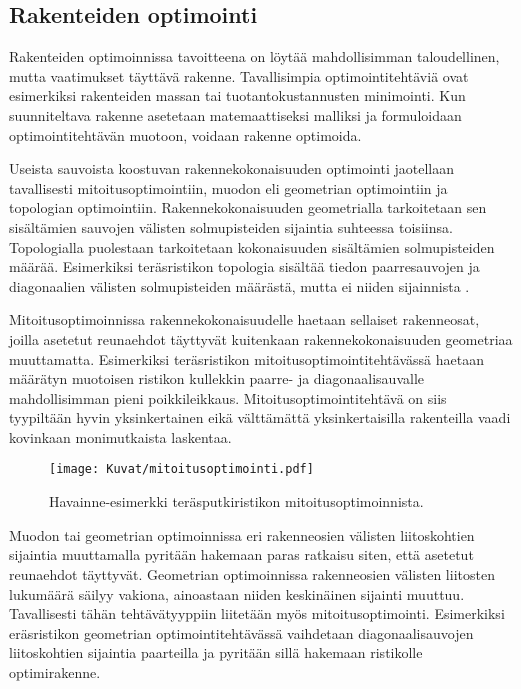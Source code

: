 \documentclass[12pt]{article}
\newenvironment{content}{\pagenumbering{arabic}}{}
\begin{document}
\begin{content}
\subsection{Rakenteiden optimointi}

Rakenteiden optimoinnissa tavoitteena on löytää mahdollisimman taloudellinen, mutta vaatimukset täyttävä rakenne. Tavallisimpia optimointitehtäviä ovat esimerkiksi rakenteiden massan tai tuotantokustannusten minimointi. Kun suunniteltava rakenne asetetaan matemaattiseksi malliksi ja formuloidaan optimointitehtävän muotoon, voidaan rakenne optimoida.  

Useista sauvoista koostuvan rakennekokonaisuuden optimointi jaotellaan tavallisesti mitoitusoptimointiin, muodon eli geometrian optimointiin ja topologian optimointiin. Rakennekokonaisuuden geometrialla tarkoitetaan sen sisältämien sauvojen välisten solmupisteiden sijaintia suhteessa toisiinsa. Topologialla puolestaan tarkoitetaan kokonaisuuden sisältämien solmupisteiden määrää. Esimerkiksi teräsristikon topologia sisältää tiedon paarresauvojen ja diagonaalien välisten solmupisteiden määrästä, mutta ei niiden sijainnista \parencite[2]{mela_doct}.

Mitoitusoptimoinnissa rakennekokonaisuudelle haetaan sellaiset rakenneosat, joilla asetetut reunaehdot täyttyvät kuitenkaan rakennekokonaisuuden geometriaa muuttamatta. Esimerkiksi teräsristikon mitoitusoptimointitehtävässä haetaan määrätyn muotoisen ristikon kullekkin paarre- ja diagonaalisauvalle mahdollisimman pieni poikkileikkaus. Mitoitusoptimointitehtävä on siis tyypiltään hyvin yksinkertainen eikä välttämättä yksinkertaisilla rakenteilla vaadi kovinkaan monimutkaista laskentaa.
\begin{figure}[htb]

\texttt{[image: Kuvat/mitoitusoptimointi.pdf]}
\caption{Havainne-esimerkki teräsputkiristikon mitoitusoptimoinnista.}
\label{fig:mitoitusoptimointi}
\end{figure}

Muodon tai geometrian optimoinnissa eri rakenneosien välisten liitoskohtien sijaintia muuttamalla pyritään hakemaan paras ratkaisu siten, että asetetut reunaehdot täyttyvät. Geometrian optimoinnissa rakenneosien välisten liitosten lukumäärä säilyy vakiona, ainoastaan niiden keskinäinen sijainti muuttuu. Tavallisesti tähän tehtävätyyppiin liitetään myös mitoitusoptimointi. Esimerkiksi eräsristikon geometrian optimointitehtävässä vaihdetaan diagonaalisauvojen liitoskohtien sijaintia paarteilla ja pyritään sillä hakemaan ristikolle optimirakenne.


\end{content}
\end{document}
